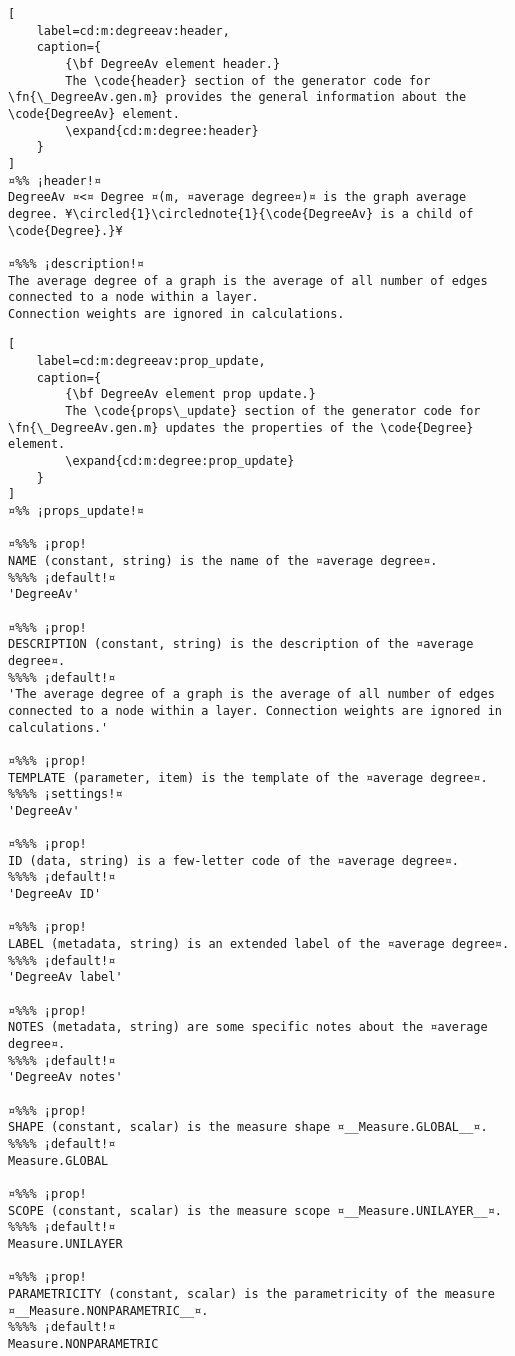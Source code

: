\documentclass{tufte-handout}
\begin{document}
\begin{lstlisting}[
	label=cd:m:degreeav:header,
	caption={
		{\bf DegreeAv element header.}
		The \code{header} section of the generator code for \fn{\_DegreeAv.gen.m} provides the general information about the \code{DegreeAv} element.
		\expand{cd:m:degree:header}
	}
]
¤%% ¡header!¤
DegreeAv ¤<¤ Degree ¤(m, ¤average degree¤)¤ is the graph average degree. ¥\circled{1}\circlednote{1}{\code{DegreeAv} is a child of \code{Degree}.}¥

¤%%% ¡description!¤
The average degree of a graph is the average of all number of edges connected to a node within a layer. 
Connection weights are ignored in calculations.
\end{lstlisting}

\begin{lstlisting}[
	label=cd:m:degreeav:prop_update,
	caption={
		{\bf DegreeAv element prop update.}
		The \code{props\_update} section of the generator code for \fn{\_DegreeAv.gen.m} updates the properties of the \code{Degree} element.
		\expand{cd:m:degree:prop_update}
	}
]
¤%% ¡props_update!¤

¤%%% ¡prop!
NAME (constant, string) is the name of the ¤average degree¤.
%%%% ¡default!¤
'DegreeAv'

¤%%% ¡prop!
DESCRIPTION (constant, string) is the description of the ¤average degree¤.
%%%% ¡default!¤
'The average degree of a graph is the average of all number of edges connected to a node within a layer. Connection weights are ignored in calculations.'

¤%%% ¡prop!
TEMPLATE (parameter, item) is the template of the ¤average degree¤.
%%%% ¡settings!¤
'DegreeAv'

¤%%% ¡prop!
ID (data, string) is a few-letter code of the ¤average degree¤.
%%%% ¡default!¤
'DegreeAv ID'

¤%%% ¡prop!
LABEL (metadata, string) is an extended label of the ¤average degree¤.
%%%% ¡default!¤
'DegreeAv label'

¤%%% ¡prop!
NOTES (metadata, string) are some specific notes about the ¤average degree¤.
%%%% ¡default!¤
'DegreeAv notes'

¤%%% ¡prop!
SHAPE (constant, scalar) is the measure shape ¤__Measure.GLOBAL__¤.
%%%% ¡default!¤
Measure.GLOBAL

¤%%% ¡prop!
SCOPE (constant, scalar) is the measure scope ¤__Measure.UNILAYER__¤.
%%%% ¡default!¤
Measure.UNILAYER

¤%%% ¡prop!
PARAMETRICITY (constant, scalar) is the parametricity of the measure ¤__Measure.NONPARAMETRIC__¤.
%%%% ¡default!¤
Measure.NONPARAMETRIC


\end{lstlisting}
\end{document}
